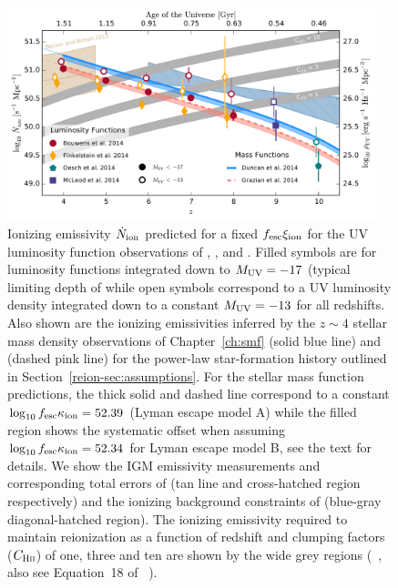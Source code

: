 \begin{figure}
\centering
  \includegraphics[width=0.95\textwidth]{plots/Fig8.pdf}
  \caption[Ionizing emissivity $\dot{N}_{\rm{ion}}$ predicted for a fixed $f_{\rm{esc}}\xi_{\rm{ion}}$ for the UV luminosity function observations of \citet{2015ApJ...803...34B}, \citet{Oesch:2014cs}, \citet{Finkelstein:2014ub} and \citet{McLeod:2014wz}.]{Ionizing emissivity $\dot{N}_{\rm{ion}}$ predicted for a fixed $f_{\rm{esc}}\xi_{\rm{ion}}$ for the UV luminosity function observations of \citet{2015ApJ...803...34B}, \citet{Oesch:2014cs}, \citet{Finkelstein:2014ub} and \citet{McLeod:2014wz}. Filled symbols are for luminosity functions integrated down to $M_{\rm{UV}} = -17$ (typical limiting depth of  while open symbols correspond to a UV luminosity density integrated down to a constant $M_{\rm{UV}} = -13$ for all redshifts. Also shown are the ionizing emissivities inferred by the $z\sim4$ stellar mass density observations of Chapter~\ref{ch:smf} (solid blue line) and \citet{Grazian:2014vx} (dashed pink line) for the power-law star-formation history  outlined in Section~\ref{reion-sec:assumptions}. For the stellar mass function predictions, the thick solid and dashed line correspond to a constant $\log_{10}f_{\rm{esc}}\kappa_{\rm{ion}} = 52.39$ (Lyman escape model A) while the filled region shows the systematic offset when assuming $\log_{10}f_{\rm{esc}}\kappa_{\rm{ion}} = 52.34$ for Lyman escape model B, see the text for details. We show the IGM emissivity measurements and corresponding total errors of \citet{Becker:2013hc} (tan line and cross-hatched region respectively) and the ionizing background constraints of \citet{Bouwens:2015tm} (blue-gray diagonal-hatched region). The ionizing emissivity required to maintain reionization as a function of redshift and clumping factors ($C_{\textsc{Hii}}$) of one, three and ten are shown by the wide grey regions (\citeauthor{Madau:1999kl}~\citeyear{Madau:1999kl}, also see Equation~18 of \citeauthor{Bolton:2007gc}~\citeyear{Bolton:2007gc}).}
  \label{reion-fig:Nion_constant}
\end{figure}

